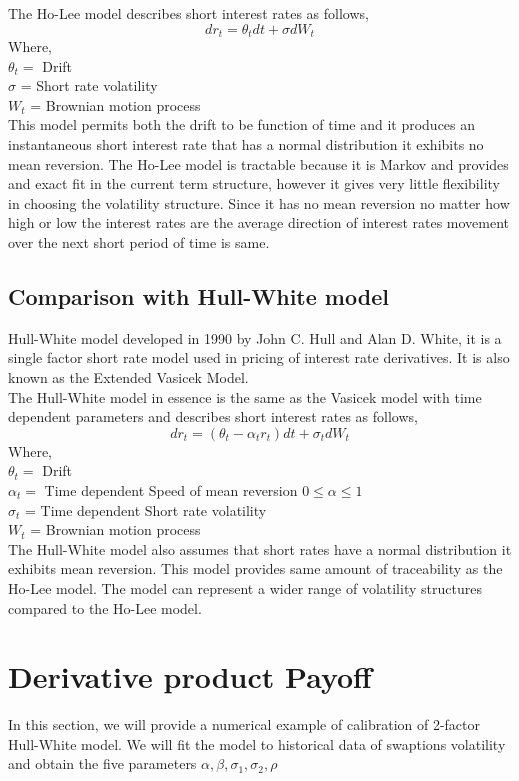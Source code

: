 \documentclass[11pt]{article}
\begin{document}
The Ho-Lee  model describes short interest rates as follows,
 \[
dr_t = \theta_t dt + \sigma  dW_t
\]
Where,\\
$\theta_t =$ Drift  \\
$\sigma$ = Short rate volatility \\
$W_t$ = Brownian motion process  \\

This model permits both the drift to be function of time and it produces an instantaneous short interest rate that has a normal distribution it exhibits no mean reversion.  The Ho-Lee model is tractable because it is Markov and provides and exact fit in the current term structure, however it gives very little flexibility in choosing the volatility structure.  Since it has no mean reversion no matter how high or low the interest rates are the average direction of interest rates movement over the next short period of time is same.

\subsection{Comparison with Hull-White model
}
Hull-White model developed in 1990 \cite{HW1} by John C. Hull and Alan D. White, it is a single factor short rate model used in pricing of interest rate derivatives.  It is also known as the Extended Vasicek Model.\\

The Hull-White model in essence is the same as the Vasicek model with time dependent parameters and describes short interest rates as follows,
 \[
dr_t = (\theta_t - \alpha_t r_t) dt + \sigma_t  dW_t
\]
Where,\\
$\theta_t =$ Drift  \\
$\alpha_t =$ Time dependent Speed of mean reversion $0 \leq \alpha \leq 1 $ \\
$\sigma_t$ = Time dependent Short rate volatility \\
$W_t$ = Brownian motion process  \\

The Hull-White model also assumes that short rates have a normal distribution it exhibits mean reversion.  This model provides same amount of traceability as the Ho-Lee model.  The model can represent a wider range of volatility structures compared to the Ho-Lee model.
\section{Derivative product Payoff}
In this section, we will provide a numerical example of calibration of
2-factor Hull-White model. We will fit the model to historical data of
swaptions volatility and obtain the five parameters
\(\alpha, \beta, \sigma_{1}, \sigma_{2}, \rho\)
\end{document}
